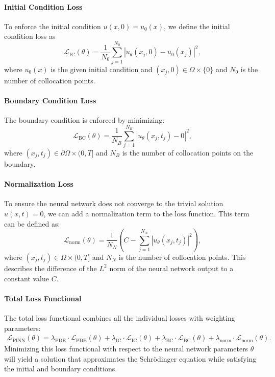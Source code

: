 \documentclass{article}
\theoremstyle{definition}
\theoremstyle{plain}
\theoremstyle{remark}
\begin{document}
\paragraph{Initial Condition Loss}
To enforce the initial condition \( u(x,0) = u_0(x) \), we define the initial condition loss as
\[\mathcal{L}_{\mathrm{IC}}(\theta) = \frac{1}{N_0} \sum_{j=1}^{N_0} \left| u_\theta(x_j, 0) - u_0(x_j) \right|^2,\]
where \( u_0(x) \) is the given initial condition and \( (x_j, 0) \in \Omega \times \{0\} \) and \( N_0 \) is the number of collocation points.

\paragraph{Boundary Condition Loss}
The boundary condition is enforced by minimizing:
\[\mathcal{L}_{\mathrm{BC}}(\theta) = \frac{1}{N_B} \sum_{j=1}^{N_B} \left| u_\theta(x_j, t_j) - 0 \right|^2,\]
where \( (x_j, t_j) \in \partial \Omega \times (0,T] \) and \( N_B \) is the number of collocation points on the boundary.

\paragraph{Normalization Loss}
To ensure the neural network does not converge to the trivial solution \( u(x,t) = 0 \), we can add a normalization term to the loss function. 
This term can be defined as:
\[\mathcal{L}_{\mathrm{norm}}(\theta) = \frac{1}{N_N} \left(C - \sum_{j=1}^{N_N} \left|  u_\theta(x_j, t_j) \right|^2\right),\]
where \( (x_j, t_j) \in \Omega \times (0,T] \) and \( N_N \) is the number of collocation points.
This describes the difference of the $L^2$ norm of the neural network output to a constant value $C$.

\paragraph{Total Loss Functional}
The total loss functional combines all the individual losses with weighting parameters:
\begin{align*}
\mathcal{L}_{\mathrm{PINN}}(\theta) =
\lambda_{\mathrm{PDE}} \cdot \mathcal{L}_{\mathrm{PDE}}(\theta) +
\lambda_{\mathrm{IC}} \cdot \mathcal{L}_{\mathrm{IC}}(\theta) +
\lambda_{\mathrm{BC}} \cdot \mathcal{L}_{\mathrm{BC}}(\theta) +
\lambda_{\mathrm{norm}} \cdot \mathcal{L}_{\mathrm{norm}}(\theta).
\end{align*}
Minimizing this loss functional with respect to the neural network parameters \( \theta \) will yield a solution that approximates the Schrödinger equation while satisfying the initial and boundary conditions.
\end{document}
